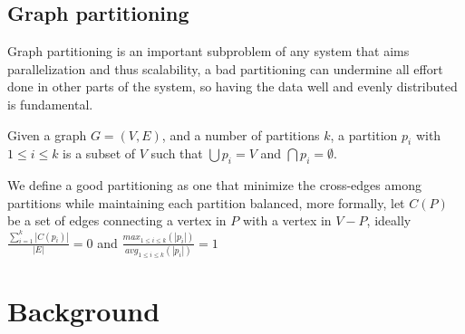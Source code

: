 \subsection{Graph partitioning}
Graph partitioning is an important subproblem of any system that aims parallelization and thus scalability, a bad partitioning can undermine all effort done in other parts of the system, so having the data well and evenly distributed is fundamental.


Given a graph $G = (V, E)$, and a number of partitions $k$, a partition $p_i$ with $1 \leq i \leq k$ is a subset of $V$ such that $\bigcup p_i = V$ and $\bigcap p_i = \emptyset$.

We define a good partitioning as one that minimize the cross-edges among partitions while maintaining each partition balanced, more formally, let $C(P)$ be a set of edges connecting a vertex in $P$ with a vertex in $V - P$, ideally $\frac{\sum_{i=1}^{k}|C(p_i)|}{|E|} = 0$ and $\frac{max_{1 \leq i \leq k}(|p_i|)}{avg_{1 \leq i \leq k}(|p_i|)} = 1$\section{Background}
